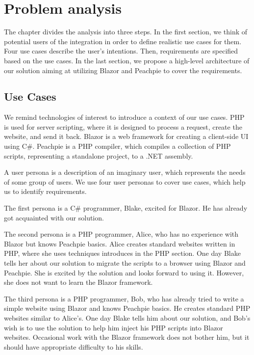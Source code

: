 \chapter{Problem analysis}
The chapter divides the analysis into three steps.
In the first section, we think of potential users of the integration in order to define realistic use cases for them.
Four use cases describe the user's intentions.
Then, requirements are specified based on the use cases.
In the last section, we propose a high-level architecture of our solution aiming at utilizing Blazor and Peachpie to cover the requirements.

\section{Use Cases}
We remind technologies of interest to introduce a context of our use cases.
PHP is used for server scripting, where it is designed to process a request, create the website, and send it back.
Blazor is a web framework for creating a client-side UI using C\#.
Peachpie is a PHP compiler, which compiles a collection of PHP scripts, representing a standalone project, to a .NET assembly.
\par
A user persona \cite{online:persona} is a description of an imaginary user, which represents the needs of some group of users.
We use four user personas to cover use cases, which help us to identify requirements.
\par
The first persona is a C\# programmer, Blake, excited for Blazor.
He has already got acquainted with our solution.
\par
The second persona is a PHP programmer, Alice, who has no experience with Blazor but knows Peachpie basics.
Alice creates standard websites written in PHP, where she uses techniques introduces in the PHP section.
One day Blake tells her about our solution to migrate the scripts to a browser using Blazor and Peachpie.
She is excited by the solution and looks forward to using it.
However, she does not want to learn the Blazor framework.
\par
The third persona is a PHP programmer, Bob, who has already tried to write a simple website using Blazor and knows Peachpie basics.
He creates standard PHP websites similar to Alice's.
One day Blake tells him about our solution, and Bob's wish is to use the solution to help him inject his PHP scripts into Blazor websites.
Occasional work with the Blazor framework does not bother him, but it should have appropriate difficulty to his skills.
\par
